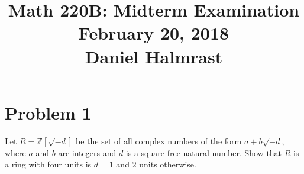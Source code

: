 \documentclass[12pt,reqno]{amsart}
\newcommand{\Z}{\mathbb{Z}}
\begin{document}
\title[]{Math 220B: Midterm Examination\\February 20, 2018\\Daniel Halmrast}
\maketitle
\large

\section*{Problem 1}
Let $R = \Z[\sqrt{-d}]$ be the set of all complex numbers of the form
$a+b\sqrt{-d}$, where $a$ and $b$ are integers and $d$ is a square-free natural
number. Show that $R$ is a ring with four units is $d=1$ and $2$ units
otherwise.
\\
\\
\end{document}
